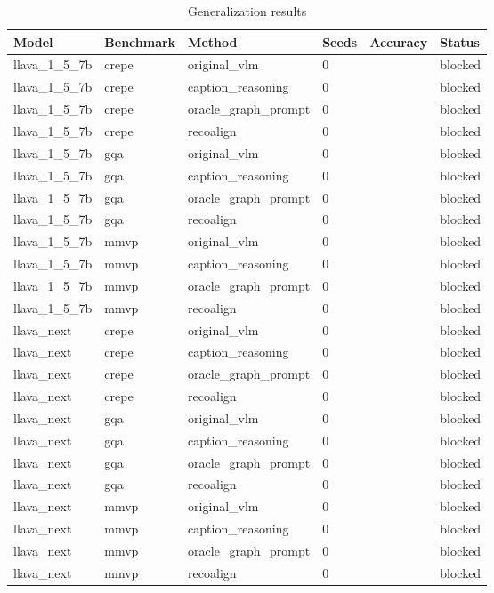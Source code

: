 \begin{table}[t]
\centering
\caption{Generalization results}
\begin{tabular}{llllll}
\toprule
Model & Benchmark & Method & Seeds & Accuracy & Status \\
\midrule
llava\_1\_5\_7b & crepe & original\_vlm & 0 &  & blocked \\
llava\_1\_5\_7b & crepe & caption\_reasoning & 0 &  & blocked \\
llava\_1\_5\_7b & crepe & oracle\_graph\_prompt & 0 &  & blocked \\
llava\_1\_5\_7b & crepe & recoalign & 0 &  & blocked \\
llava\_1\_5\_7b & gqa & original\_vlm & 0 &  & blocked \\
llava\_1\_5\_7b & gqa & caption\_reasoning & 0 &  & blocked \\
llava\_1\_5\_7b & gqa & oracle\_graph\_prompt & 0 &  & blocked \\
llava\_1\_5\_7b & gqa & recoalign & 0 &  & blocked \\
llava\_1\_5\_7b & mmvp & original\_vlm & 0 &  & blocked \\
llava\_1\_5\_7b & mmvp & caption\_reasoning & 0 &  & blocked \\
llava\_1\_5\_7b & mmvp & oracle\_graph\_prompt & 0 &  & blocked \\
llava\_1\_5\_7b & mmvp & recoalign & 0 &  & blocked \\
llava\_next & crepe & original\_vlm & 0 &  & blocked \\
llava\_next & crepe & caption\_reasoning & 0 &  & blocked \\
llava\_next & crepe & oracle\_graph\_prompt & 0 &  & blocked \\
llava\_next & crepe & recoalign & 0 &  & blocked \\
llava\_next & gqa & original\_vlm & 0 &  & blocked \\
llava\_next & gqa & caption\_reasoning & 0 &  & blocked \\
llava\_next & gqa & oracle\_graph\_prompt & 0 &  & blocked \\
llava\_next & gqa & recoalign & 0 &  & blocked \\
llava\_next & mmvp & original\_vlm & 0 &  & blocked \\
llava\_next & mmvp & caption\_reasoning & 0 &  & blocked \\
llava\_next & mmvp & oracle\_graph\_prompt & 0 &  & blocked \\
llava\_next & mmvp & recoalign & 0 &  & blocked \\

\end{tabular}
\end{table}

